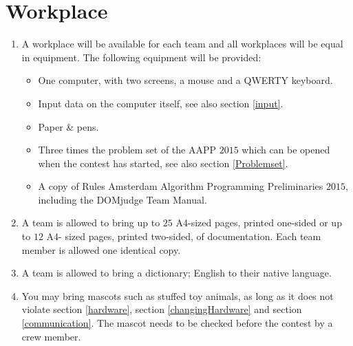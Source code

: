 \documentclass[11pt]{report}
\begin{document}
\section{Workplace}
\begin{enumerate}[label=\bfseries 4.3.\arabic*]
\item A workplace will be available for each team and all workplaces will be equal in equipment. The following equipment will be provided:
\begin{itemize}
	\item One computer, with two screens, a mouse and a QWERTY keyboard. %
	\item Input data on the computer itself, see also section \ref{input}.
	\item Paper \& pens.
	\item Three times the problem set of the AAPP $2015$ which can be opened when the contest has started, see also section \ref{Problemset}.
	\item A copy of Rules Amsterdam Algorithm Programming Preliminaries $2015$, including the DOMjudge Team Manual.
\end{itemize}
\item A team is allowed to bring up to $25$ A4-sized pages, printed one-sided or up to $12$ A4- sized pages, printed two-sided, of documentation. Each team member is allowed one identical copy.
\item A team is allowed to bring a dictionary; English to their native language.
\item You may bring mascots such as stuffed toy animals, as long as it does not violate section \ref{hardware}, section \ref{changingHardware} and section \ref{communication}. The mascot needs to be checked before the contest by a crew member.
\end{enumerate}
\end{document}
